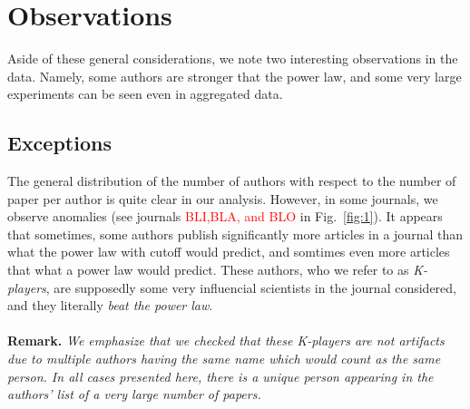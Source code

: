 \documentclass[aps,prl,floatfix,twocolumn]{revtex4-1}
\begin{document}
\section{Observations}
Aside of these general considerations, we note two interesting observations in the data. 
Namely, some authors are stronger that the power law, and some very large experiments can be seen even in aggregated data. 

\subsection{Exceptions }
The general distribution of the number of authors with respect to the number of paper per author is quite clear in our analysis. 
However, in some journals, we observe anomalies (see journals \textcolor{red}{BLI,BLA, and BLO} in Fig.~\ref{fig:1}). 
It appears that sometimes, some authors publish significantly more articles in a journal than what the power law with cutoff would predict, and somtimes even more articles that what a power law would predict. 
These authors, who we refer to as \emph{K-players}, are supposedly some very influencial scientists in the journal considered, and they literally \emph{beat the power law}.

\paragraph{}
{\bf Remark.}\textit{
We emphasize that we checked that these K-players are not artifacts due to multiple authors having the same name which would count as the same person. 
In all cases presented here, there is a unique person appearing in the authors' list of a very large number of papers. 
}
\end{document}

